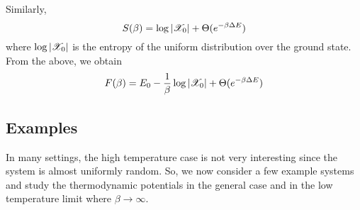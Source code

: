 \documentclass[letterpaper,english,12pt]{article}
\begin{document}
Similarly,
\begin{equation}
S(\beta) = \log |\mathscr{X}_0| + \Theta(e^{-\beta \Delta E})
\end{equation}
where $\log |\mathscr{X}_0|$ is the entropy of the uniform distribution over the ground state. From the above, we obtain
\begin{equation}
F(\beta) = E_0 - \frac{1}{\beta} \log |\mathscr{X}_0| + \Theta(e^{-\beta \Delta E})
\end{equation}
\subsection{Examples}
In many settings, the high temperature case is not very interesting since the system is almost uniformly random. So, we now consider a few example systems and study the thermodynamic potentials in the general case and in the low temperature limit where $\beta \rightarrow \infty$.
\end{document}
